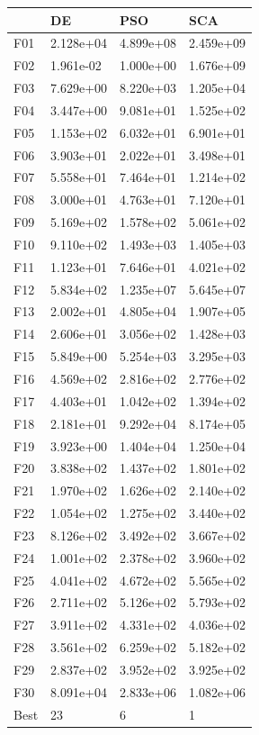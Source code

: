 \begin{tabular}{llll}
\toprule
{} &         DE &        PSO &        SCA \\
\midrule
F01  &  2.128e+04 &  4.899e+08 &  2.459e+09 \\
F02  &  1.961e-02 &  1.000e+00 &  1.676e+09 \\
F03  &  7.629e+00 &  8.220e+03 &  1.205e+04 \\
F04  &  3.447e+00 &  9.081e+01 &  1.525e+02 \\
F05  &  1.153e+02 &  6.032e+01 &  6.901e+01 \\
F06  &  3.903e+01 &  2.022e+01 &  3.498e+01 \\
F07  &  5.558e+01 &  7.464e+01 &  1.214e+02 \\
F08  &  3.000e+01 &  4.763e+01 &  7.120e+01 \\
F09  &  5.169e+02 &  1.578e+02 &  5.061e+02 \\
F10  &  9.110e+02 &  1.493e+03 &  1.405e+03 \\
F11  &  1.123e+01 &  7.646e+01 &  4.021e+02 \\
F12  &  5.834e+02 &  1.235e+07 &  5.645e+07 \\
F13  &  2.002e+01 &  4.805e+04 &  1.907e+05 \\
F14  &  2.606e+01 &  3.056e+02 &  1.428e+03 \\
F15  &  5.849e+00 &  5.254e+03 &  3.295e+03 \\
F16  &  4.569e+02 &  2.816e+02 &  2.776e+02 \\
F17  &  4.403e+01 &  1.042e+02 &  1.394e+02 \\
F18  &  2.181e+01 &  9.292e+04 &  8.174e+05 \\
F19  &  3.923e+00 &  1.404e+04 &  1.250e+04 \\
F20  &  3.838e+02 &  1.437e+02 &  1.801e+02 \\
F21  &  1.970e+02 &  1.626e+02 &  2.140e+02 \\
F22  &  1.054e+02 &  1.275e+02 &  3.440e+02 \\
F23  &  8.126e+02 &  3.492e+02 &  3.667e+02 \\
F24  &  1.001e+02 &  2.378e+02 &  3.960e+02 \\
F25  &  4.041e+02 &  4.672e+02 &  5.565e+02 \\
F26  &  2.711e+02 &  5.126e+02 &  5.793e+02 \\
F27  &  3.911e+02 &  4.331e+02 &  4.036e+02 \\
F28  &  3.561e+02 &  6.259e+02 &  5.182e+02 \\
F29  &  2.837e+02 &  3.952e+02 &  3.925e+02 \\
F30  &  8.091e+04 &  2.833e+06 &  1.082e+06 \\
Best &         23 &          6 &          1 \\
\bottomrule
\end{tabular}
